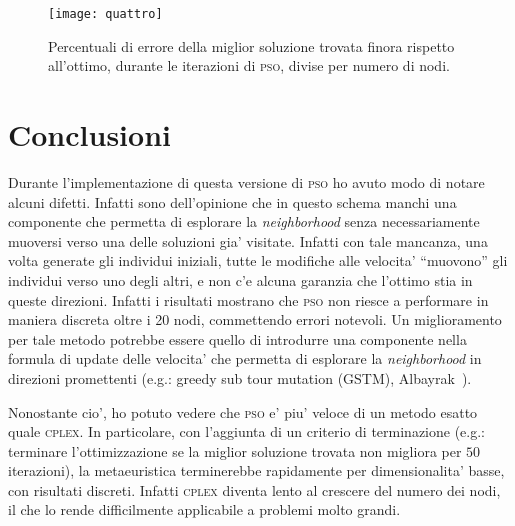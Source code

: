 \documentclass[
12pt, %
a4paper, %
oneside, %
headinclude,footinclude, %
BCOR5mm, %
]{scrartcl}
\begin{document}
\begin{figure}[H]
	\centering
	\texttt{[image: quattro]}
	\caption[]{Percentuali di errore della miglior soluzione trovata finora rispetto all'ottimo, durante le iterazioni di \textsc{pso}, divise per numero di nodi.}
	\label{fig:quattro}
\end{figure}

\section{Conclusioni}\label{sec:conclusioni}

Durante l'implementazione di questa versione di \textsc{pso} ho avuto modo di notare alcuni difetti. Infatti sono dell'opinione che in questo schema manchi una componente che permetta di esplorare la \textit{neighborhood} senza necessariamente muoversi verso una delle soluzioni gia' visitate. Infatti con tale mancanza, una volta generate gli individui iniziali, tutte le modifiche alle velocita' ``muovono'' gli individui verso uno degli altri, e non c'e alcuna garanzia che l'ottimo stia in queste direzioni. Infatti i risultati mostrano che \textsc{pso} non riesce a performare in maniera discreta oltre i 20 nodi, commettendo errori notevoli. Un miglioramento per tale metodo potrebbe essere quello di introdurre una componente nella formula di update delle velocita' che permetta di esplorare la \textit{neighborhood} in direzioni promettenti (e.g.: greedy sub tour mutation (GSTM),  Albayrak~\cite{albayrak2011development}). 
 
Nonostante cio', ho potuto vedere che \textsc{pso} e' piu' veloce di un metodo esatto quale \textsc{cplex}. In particolare, con l'aggiunta di un criterio di terminazione (e.g.: terminare l'ottimizzazione se la miglior soluzione trovata non migliora per $50$ iterazioni), la metaeuristica terminerebbe rapidamente per dimensionalita' basse, con risultati discreti. Infatti \textsc{cplex} diventa lento al crescere del numero dei nodi, il che lo rende difficilmente applicabile a problemi molto grandi.

\renewcommand{\refname}{\spacedlowsmallcaps{References}} %




\end{document}
